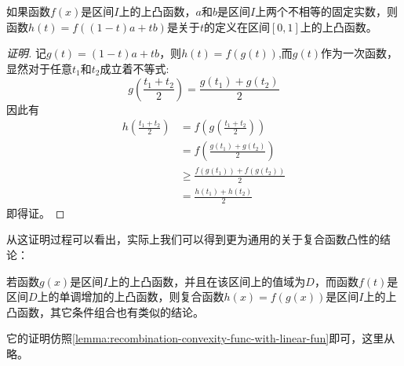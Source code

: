 \begin{lemma}
  \label{lemma:recombination-convexity-func-with-linear-fun}
如果函数$f(x)$是区间$I$上的上凸函数，$a$和$b$是区间$I$上两个不相等的固定实数，则函数$h(t)=f((1-t)a+tb)$是关于$t$的定义在区间$[0,1]$上的上凸函数。
\end{lemma}
\begin{proof}[证明]
 记$g(t)=(1-t)a+tb$，则$h(t)=f(g(t))$,而$g(t)$作为一次函数，显然对于任意$t_1$和$t_2$成立着不等式:
\[ g \left( \frac{t_1+t_2}{2} \right)=\frac{g(t_1)+g(t_2)}{2} \] 
因此有
\begin{align*}
  h \left( \frac{t_1+t_2}{2} \right) &= f \left( g\left( \frac{t_1+t_2}{2} \right) \right) \\
& = f \left( \frac{g(t_1)+g(t_2)}{2} \right) \\
& \geqslant \frac{f(g(t_1))+f(g(t_2))}{2} \\
& = \frac{h(t_1)+h(t_2)}{2}
\end{align*}
即得证。
\end{proof}

从这证明过程可以看出，实际上我们可以得到更为通用的关于复合函数凸性的结论：
\begin{theorem}
  若函数$g(x)$是区间$I$上的上凸函数，并且在该区间上的值域为$D$，而函数$f(t)$是区间$D$上的单调增加的上凸函数，则复合函数$h(x)=f(g(x))$是区间$I$上的上凸函数，其它条件组合也有类似的结论。
\end{theorem}
它的证明仿照\autoref{lemma:recombination-convexity-func-with-linear-fun}即可，这里从略。

